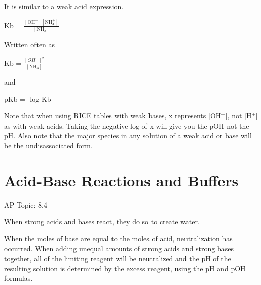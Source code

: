 \documentclass[../chem.tex]{subfiles}
\begin{document}
It is similar to a weak acid expression.
\begin{center}
    Kb = $\frac{[\text{OH}^-][\text{NH}_4^+]}{[\text{NH}_3]}$
\end{center}
Written often as 
\begin{center}
    Kb = $\frac{[OH^-]^2}{[\text{NH}_3]}$
\end{center}
and 
\begin{center}
    pKb = -log Kb
\end{center}

Note that when using RICE tables with weak bases, x represents [OH$^-$], not [H$^+$] as with weak acids. Taking the negative log of x 
will give you the pOH not the pH. Also note that the major species in any solution of a weak acid or base will be the undisassociated form.
\section{Acid-Base Reactions and Buffers}
AP Topic: 8.4

When strong acids and bases react, they do so to create water.

When the moles of base are equal to the moles of acid, neutralization has occurred. When adding unequal amounts of strong acids and strong bases 
together, all of the limiting reagent will be neutralized and the pH of the resulting solution is determined by the excess reagent, using the pH and pOH formulas.
\end{document}
